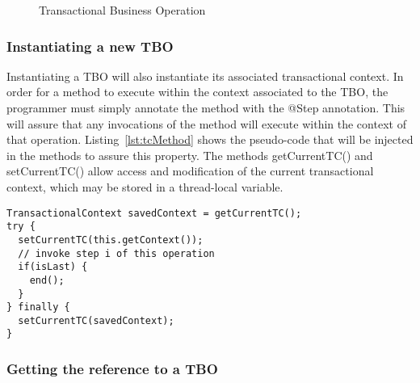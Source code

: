 \documentclass{llncs}
\begin{document}
\begin{figure}
  \centering

\caption{Transactional Business Operation}
\label{fig:TBO}

\end{figure}

\subsubsection{Instantiating a new TBO}

Instantiating a TBO will also instantiate its associated transactional
context. In order for a method to execute within the context
associated to the TBO, the programmer must simply annotate the method
with the @Step annotation. This will assure that any invocations of
the method will execute within the context of that
operation. Listing~\ref{lst:tcMethod} shows the pseudo-code that will
be injected in the methods to assure this property. The methods
getCurrentTC() and setCurrentTC() allow access and modification of the
current transactional context, which may be stored in a thread-local
variable.

\begin{lstlisting}
TransactionalContext savedContext = getCurrentTC();
try {
  setCurrentTC(this.getContext());
  // invoke step i of this operation
  if(isLast) {
    end();
  }
} finally {
  setCurrentTC(savedContext);
}
\end{lstlisting}

\subsubsection{Getting the reference to a TBO}
\end{document}
